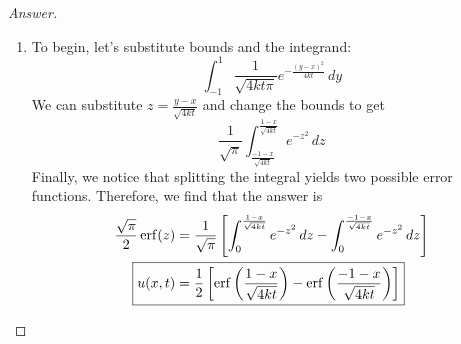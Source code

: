 \documentclass{article}
\theoremstyle{definition}
\renewcommand\qedsymbol{$\blacksquare$}
\newenvironment{ans}{\begin{proof}[Answer]\renewcommand{\qedsymbol}{}}{\end{proof}}
\DeclareMathOperator{\erf}{erf}
\begin{document}
\begin{ans}
    \begin{enumerate}
        \item To begin, let's substitute bounds and the integrand:
        \[\int_{-1}^1 \frac{1}{\sqrt{4kt\pi}}e^{-\frac{(y-x)^2}{4kt}}\,dy\]
        We can substitute $z = \frac{y-x}{\sqrt{4kt}}$ and change the bounds to get
        \[ \frac{1}{\sqrt{\pi}}\int_{ \frac{-1-x}{\sqrt{4kt}}}^{ \frac{1-x}{\sqrt{4kt}}} e^{-z^2}\,dz \]
        Finally, we notice that splitting the integral yields two possible error functions. Therefore, we find that the answer is
        \begin{align*}
             \frac{\sqrt{\pi}}{2}\erf(z) &= \frac{1}{\sqrt{\pi}} \left[ \int_0^{ \frac{1-x}{\sqrt{4kt}}} e^{-z^2}\,dz - \int_0^{ \frac{-1-x}{\sqrt{4kt}}} e^{-z^2}\,dz \right]\\
             \Aboxed{ u(x,t) &= \frac{1}{2} \left[ \erf\left(\frac{1-x}{\sqrt{4kt}}\right) - \erf\left(\frac{-1-x}{\sqrt{4kt}}\right) \right] }
        \end{align*}


\end{enumerate}
\end{ans}
\end{document}
